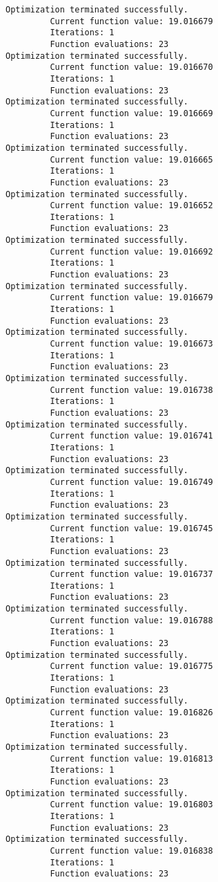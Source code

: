 \documentclass[11pt]{article}
\begin{document}
\begin{Verbatim}[commandchars=\\\{\}]
Optimization terminated successfully.
         Current function value: 19.016679
         Iterations: 1
         Function evaluations: 23
Optimization terminated successfully.
         Current function value: 19.016670
         Iterations: 1
         Function evaluations: 23
Optimization terminated successfully.
         Current function value: 19.016669
         Iterations: 1
         Function evaluations: 23
Optimization terminated successfully.
         Current function value: 19.016665
         Iterations: 1
         Function evaluations: 23
Optimization terminated successfully.
         Current function value: 19.016652
         Iterations: 1
         Function evaluations: 23
Optimization terminated successfully.
         Current function value: 19.016692
         Iterations: 1
         Function evaluations: 23
Optimization terminated successfully.
         Current function value: 19.016679
         Iterations: 1
         Function evaluations: 23
Optimization terminated successfully.
         Current function value: 19.016673
         Iterations: 1
         Function evaluations: 23
Optimization terminated successfully.
         Current function value: 19.016738
         Iterations: 1
         Function evaluations: 23
Optimization terminated successfully.
         Current function value: 19.016741
         Iterations: 1
         Function evaluations: 23
Optimization terminated successfully.
         Current function value: 19.016749
         Iterations: 1
         Function evaluations: 23
Optimization terminated successfully.
         Current function value: 19.016745
         Iterations: 1
         Function evaluations: 23
Optimization terminated successfully.
         Current function value: 19.016737
         Iterations: 1
         Function evaluations: 23
Optimization terminated successfully.
         Current function value: 19.016788
         Iterations: 1
         Function evaluations: 23
Optimization terminated successfully.
         Current function value: 19.016775
         Iterations: 1
         Function evaluations: 23
Optimization terminated successfully.
         Current function value: 19.016826
         Iterations: 1
         Function evaluations: 23
Optimization terminated successfully.
         Current function value: 19.016813
         Iterations: 1
         Function evaluations: 23
Optimization terminated successfully.
         Current function value: 19.016803
         Iterations: 1
         Function evaluations: 23
Optimization terminated successfully.
         Current function value: 19.016838
         Iterations: 1
         Function evaluations: 23

\end{Verbatim}
\end{document}

